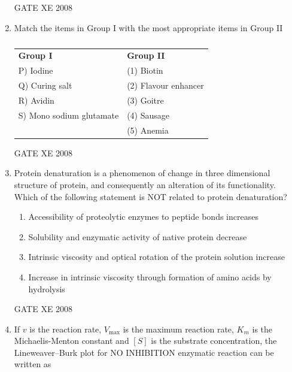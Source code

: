 \documentclass[12pt]{article}
\begin{document}
\begin{enumerate}[label=Q\arabic*.]
GATE XE 2008

\item Match the items in Group I with the most appropriate items in Group II  

\begin{table}[H]     \centering     \caption{}     \label{}     \begin{tabular}{l l}
\textbf{Group I} & \textbf{Group II} \\
P) Iodine & (1) Biotin \\
Q) Curing salt & (2) Flavour enhancer \\
R) Avidin & (3) Goitre \\
S) Mono sodium glutamate & (4) Sausage \\
 & (5) Anemia \\
\end{tabular} \end{table}  

\begin{enumerate}[label=(\Alph*)]
\end{enumerate}

GATE XE 2008

\item  Protein denaturation is a phenomenon of change in three dimensional structure of protein, and consequently an alteration of its functionality. Which of the following statement is NOT related to protein denaturation?  

\begin{enumerate}[label=(\Alph*)]
\item  Accessibility of proteolytic enzymes to peptide bonds increases 
\item  Solubility and enzymatic activity of native protein decrease  
\item  Intrinsic viscosity and optical rotation of the protein solution increase  
\item  Increase in intrinsic viscosity through formation of amino acids by hydrolysis 
\end{enumerate}

GATE XE 2008

\item If $v$ is the reaction rate, $V_{\max}$ is the maximum reaction rate, $K_m$ is the Michaelis-Menton constant and $[S]$ is the substrate concentration, the Lineweaver–Burk plot for NO INHIBITION enzymatic reaction can be written as  


\end{enumerate}
\end{document}

